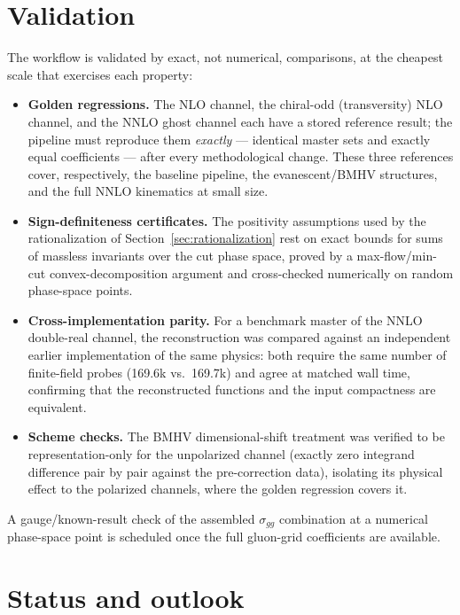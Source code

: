 \documentclass[11pt]{article}
\begin{document}
\section{Validation}
\label{sec:validation}

The workflow is validated by exact, not numerical, comparisons, at the
cheapest scale that exercises each property:

\begin{itemize}
\item \textbf{Golden regressions.}  The NLO channel, the chiral-odd
  (transversity) NLO channel, and the NNLO ghost channel each have a
  stored reference result; the pipeline must reproduce them
  \emph{exactly} --- identical master sets and exactly equal
  coefficients --- after every methodological change.  These three
  references cover, respectively, the baseline pipeline, the
  evanescent/BMHV structures, and the full NNLO kinematics at small
  size.
\item \textbf{Sign-definiteness certificates.}  The positivity
  assumptions used by the rationalization of
  Section~\ref{sec:rationalization} rest on exact bounds for sums of
  massless invariants over the cut phase space, proved by a
  max-flow/min-cut convex-decomposition argument and cross-checked
  numerically on random phase-space points.
\item \textbf{Cross-implementation parity.}  For a benchmark master of
  the NNLO double-real channel, the reconstruction was compared
  against an independent earlier implementation of the same physics:
  both require the same number of finite-field probes (169.6k
  vs.\ 169.7k) and agree at matched wall time, confirming that the
  reconstructed functions and the input compactness are equivalent.
\item \textbf{Scheme checks.}  The BMHV dimensional-shift treatment
  was verified to be representation-only for the unpolarized channel
  (exactly zero integrand difference pair by pair against the
  pre-correction data), isolating its physical effect to the
  polarized channels, where the golden regression covers it.
\end{itemize}

A gauge/known-result check of the assembled $\sigma_{gg}$ combination
at a numerical phase-space point is scheduled once the full gluon-grid
coefficients are available.

\section{Status and outlook}
\label{sec:outlook}
\end{document}
